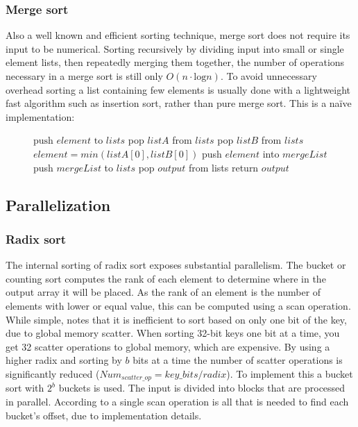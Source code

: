 \documentclass[twocolumn]{article} %
\begin{document}
		\subsubsection*{Merge sort}
			Also a well known and efficient sorting technique, merge sort does not require its input to be numerical. Sorting
			recursively by dividing input into small or single element lists, then repeatedly merging them together, the number of
			operations necessary in a merge sort is still only $O(n \cdot \text{log}n)$. To avoid unnecessary overhead sorting a
			list containing few elements is usually done with a lightweight fast algorithm such as insertion sort, rather than
			pure merge sort. This is a naïve implementation:\\
			\begin{figure}[h]
			\begin{algorithmic}
					\State $\text{push $element$ to }lists$
				\EndFor
					\State pop $listA$ from $lists$
					\State pop $listB$ from $lists$
						\State $element = min(listA[0], listB[0])$
						\State push $element$ into $mergeList$
					\EndWhile
					\State push $mergeList$ to $lists$
				\EndWhile
				\State pop $output$ from lists
				\State return $output$
			\end{algorithmic}
			\end{figure}
	
	\subsection*{Parallelization}
		\subsubsection*{Radix sort}
			The internal sorting of radix sort exposes substantial parallelism. The bucket or counting sort computes the rank of
			each element to determine where in the output array it will be placed. As the rank of an element is the number of
			elements with lower or equal value, this can be computed using a scan operation. While simple, \cite{satish09} notes
			that it is inefficient to sort based on only one bit of the key, due to global memory scatter. When sorting 32-bit
			keys one bit at a time, you get 32 scatter operations to global memory, which are expensive. By using a higher radix
			and sorting by $b$ bits at a time the number of scatter operations is significantly reduced ($Num_{scatter\_op} = key\_bits/radix$).
			To implement this a bucket sort with $2^b$ buckets is used. The input is divided into blocks that are processed in
			parallel. According to \cite{satish09} a single scan operation is all that is needed to find each bucket's offset,
			due to implementation details.
			
\end{document}
